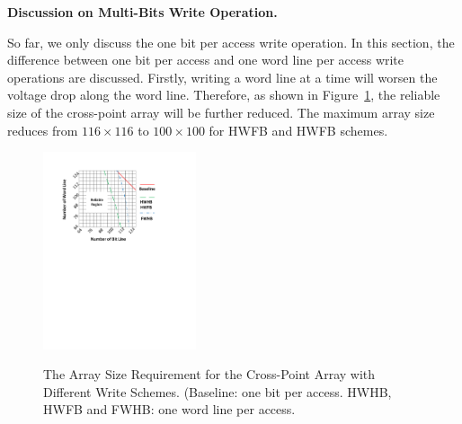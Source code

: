\vspace{6pt} \textbf{Discussion on Multi-Bits Write Operation.} \vspace{6pt}

So far, we only discuss the one bit per access write operation. In this section, the difference between one bit per access and one word line per access write operations are discussed. Firstly, writing a word line at a time will worsen the voltage drop along the word line. Therefore, as shown in Figure~\ref{fig:reliable_region}, the reliable size of the cross-point array will be further reduced. The maximum array size reduces from $116{\times}116$ to $100{\times}100$ for HWFB and HWFB schemes.


\begin{figure}%
\centering
  \includegraphics[width=0.4\textwidth]{./figures/multiwrite.pdf}\\
  \caption{The Array Size Requirement for the Cross-Point Array with Different Write Schemes. (Baseline: one bit per access. HWHB, HWFB and FWHB: one word line per access. }\label{fig:reliable_region}
    \vspace{-10pt}
\end{figure}

